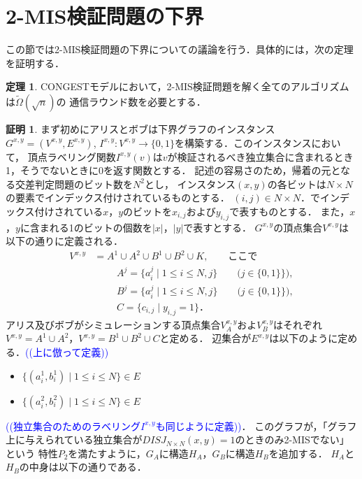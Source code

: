 \documentclass[12pt]{thesis}
\newcommand{\Izumi}[1]{\textcolor{blue}{(#1)}}
\newcommand{\CONGEST}{\textsf{CONGEST}}
\theoremstyle{definition}
\newtheorem{theorem}{定理}[chapter]
\newtheorem*{prf*}{証明}
\begin{document}
\section{2-MIS検証問題の下界}
この節では2-MIS検証問題の下界についての議論を行う．具体的には，次の定理を証明する．
\begin{theorem}
{\CONGEST}モデルにおいて，2-MIS検証問題を解く全てのアルゴリズムは$\tilde{\Omega} (\sqrt{n})$の
通信ラウンド数を必要とする．
\end{theorem}
\begin{prf*}
まず初めにアリスとボブは下界グラフのインスタンス$G^{x,y} = (V^{x,y}, E^{x,y})$, 
$I^{x,y} : V^{x,y} \to \{0, 1\}$を構築する．このインスタンスにおいて，
頂点ラベリング関数$I^{x,y}(v)$は$v$が検証されるべき独立集合に含まれるとき1，そうでないときに0を返す関数とする．
記述の容易さのため，帰着の元となる交差判定問題のビット数を$N^2$とし，
インスタンス$(x, y)$の各ビットは$N\times N$の要素でインデックス付けされているものとする．
$(i, j) \in N \times N$．でインデックス付けされている$x$，$y$のビットを$x_{i,j}$および$y_{i,j}$で表すものとする．
また，$x$，$y$に含まれる1のビットの個数を$|x|$，$|y|$で表すとする．
$G^{x,y}$の頂点集合$V^{x,y}$は以下の通りに定義される．
\begin{align*}
V^{x,y} &= A^1 \cup A^2 \cup B^1 \cup B^2 \cup K, \quad \quad \text{ここで}\\
&\phantom{=} \quad A^j = \{a^{j}_{i} \mid 1\leq i \leq N, j\} \quad \quad
\text{($j \in \{0, 1\}\}$)}, \\
&\phantom{=} \quad B^j = \{a^{j}_{i} \mid 1\leq i \leq N, j\} \quad \quad
\text{($j \in \{0, 1\}\}$)}, \\
&\phantom{=} \quad C = \{c_{i,j} \mid y_{i,j} = 1\}．
\end{align*}
アリス及びボブがシミュレーションする頂点集合$V^{x,y}_A$およ$V^{x,y}_B$はそれぞれ
$V^{x,y} = A^1 \cup A^2$，$V^{x,y} = B^1 \cup B^2 \cup C$と定める．
辺集合が$E^{x,y}$は以下のように定める．\Izumi{(上に倣って定義)}
\begin{itemize}
\item $\{(a^{1}_{i}, b^{1}_{i}) \mid 1\leq i \leq N\} \in E$
\item $\{(a^{2}_{i}, b^{2}_{i}) \mid 1\leq i \leq N\} \in E$
\end{itemize}
\Izumi{(独立集合のためのラベリング$I^{x,y}$も同じように定義)}．
このグラフが，「グラフ上に与えられている独立集合が$DISJ_{N \times N} (x, y) = 1$のときのみ2-MISでない」という
特性$P_{2}$を満たすように，$G_{A}$に構造$H_{A}$，$G_{B}$に構造$H_{B}$を追加する．
$H_{A}$と$H_{B}$の中身は以下の通りである．

\end{prf*}
\end{document}
